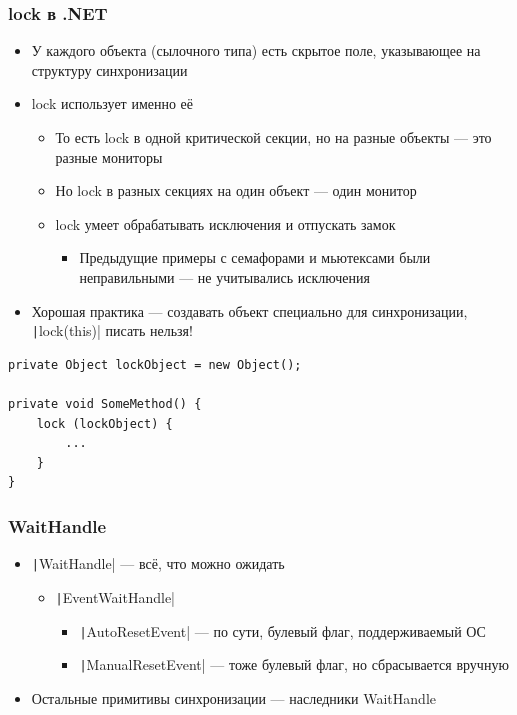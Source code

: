 \documentclass[xetex,mathserif,serif]{beamer}
\begin{document}
	\begin{frame}[fragile]
		\frametitle{lock в .NET}
		\begin{itemize}
			\item У каждого объекта (сылочного типа) есть скрытое поле, указывающее на структуру синхронизации
			\item lock использует именно её
			\begin{itemize}
				\item То есть lock в одной критической секции, но на разные объекты --- это разные мониторы
				\item Но lock в разных секциях на один объект --- один монитор
				\item lock умеет обрабатывать исключения и отпускать замок
				\begin{itemize}
					\item Предыдущие примеры с семафорами и мьютексами были неправильными --- не учитывались исключения
				\end{itemize}
			\end{itemize}
			\item Хорошая практика --- создавать объект специально для синхронизации, \texttt|lock(this)| писать нельзя!
		\end{itemize}
		\begin{footnotesize}
			\begin{verbatim}
private Object lockObject = new Object();

private void SomeMethod() {
    lock (lockObject) {
        ...
    }
}
			\end{verbatim}
		\end{footnotesize}
	\end{frame}

	\begin{frame}
		\frametitle{WaitHandle}
		\begin{itemize}
			\item \texttt|WaitHandle| --- всё, что можно ожидать
			\begin{itemize}
				\item \texttt|EventWaitHandle|
				\begin{itemize}
					\item \texttt|AutoResetEvent| --- по сути, булевый флаг, поддерживаемый ОС
					\item \texttt|ManualResetEvent| --- тоже булевый флаг, но сбрасывается вручную
				\end{itemize}
			\end{itemize}
			\item Остальные примитивы синхронизации --- наследники WaitHandle
		\end{itemize}
	\end{frame}
\end{document}
